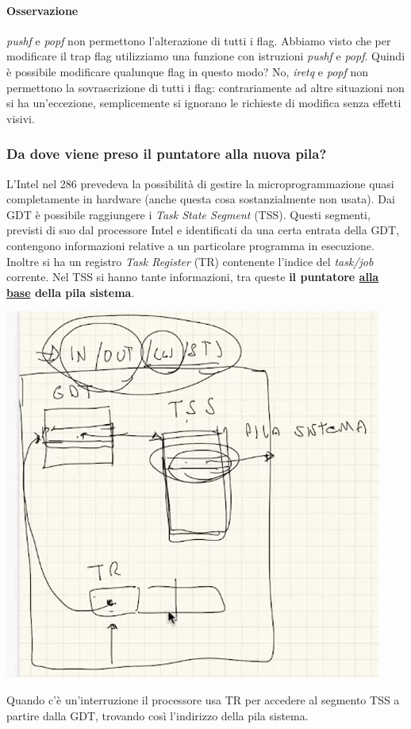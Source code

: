 \paragraph{Osservazione} \emph{pushf} e \emph{popf} non permettono l'alterazione di tutti i flag. Abbiamo visto che per modificare il trap flag utilizziamo una funzione con istruzioni \emph{pushf} e \emph{popf}. Quindi è possibile modificare qualunque flag in questo modo? No, \emph{iretq} e \emph{popf} non permettono la sovrascrizione di tutti i flag: contrariamente ad altre situazioni non si ha un'eccezione, semplicemente si ignorano le richieste di modifica senza effetti visivi.

\subsubsection{Da dove viene preso il puntatore alla nuova pila?} 
L'Intel nel 286 prevedeva la possibilità di gestire la microprogrammazione quasi completamente in hardware (anche questa cosa sostanzialmente non usata). Dai GDT è possibile raggiungere i \emph{Task State Segment} (TSS). Questi segmenti, previsti di suo dal processore Intel e identificati da una certa entrata della GDT, contengono informazioni relative a un particolare programma in esecuzione. Inoltre si ha un registro \emph{Task Register} (TR) contenente l'indice del \emph{task/job} corrente. Nel TSS si hanno tante informazioni, tra queste \textbf{il puntatore \underline{alla base} della pila sistema}. 
\begin{center}\includegraphics[scale=.75]{img/121.PNG}\end{center}
Quando c'è un'interruzione il processore usa TR per accedere al segmento TSS a partire dalla GDT, trovando così l'indirizzo della pila sistema.


